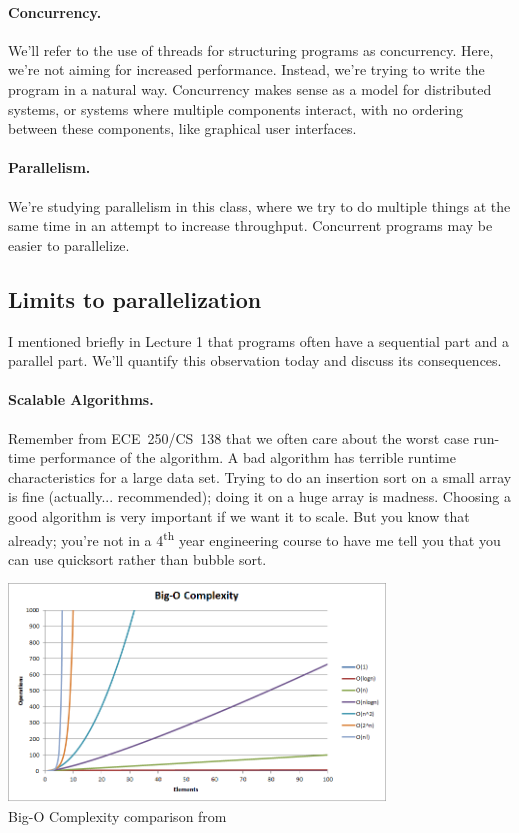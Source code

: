 \documentclass[a4paper]{report}
\begin{document}
\paragraph{Concurrency.} We'll refer to the use of threads for
structuring programs as concurrency. Here, we're not aiming
for increased performance. Instead, we're trying to write the program
in a natural way. Concurrency makes sense as a model for distributed
systems, or systems where multiple components interact, with no ordering
between these components, like graphical user interfaces.

\paragraph{Parallelism.} We're studying parallelism in this class, where
we try to do multiple things at the same time in an attempt to increase
throughput. Concurrent programs may be easier to parallelize.

\subsection*{Limits to parallelization}
I mentioned briefly in Lecture 1 that programs often have a sequential
part and a parallel part. We'll quantify this observation today
and discuss its consequences.

\paragraph{Scalable Algorithms.} 
Remember from ECE~250/CS~138 that we often care about the worst case run-time performance of the algorithm. A bad algorithm has terrible runtime characteristics for a large data set. Trying to do an insertion sort on a small array is fine (actually... recommended); doing it on a huge array is madness. Choosing a good algorithm is very important if we want it to scale.  But you know that already; you're not in a 4\textsuperscript{th} year engineering course to have me tell you that you can use quicksort rather than bubble sort.

\begin{center}
	\includegraphics[width=0.75\textwidth]{images/big-o-complexity}\\
	Big-O Complexity comparison from ~\cite{bigocheatsheet}
\end{center}
\end{document}
